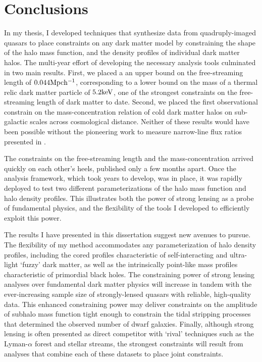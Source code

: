 \chapter{Conclusions}

In my thesis, I developed techniques that synthesize data from quadruply-imaged quasars to place constraints on any dark matter model by constraining the shape of the halo mass function, and the density profiles of individual dark matter halos. The multi-year effort of developing the necessary analysis tools culminated in two main results. First, we placed a an upper bound on the free-streaming length of $0.044 \rm{Mpc}{h^{-1}}$, corresponding to a lower bound on the mass of a thermal relic dark matter particle of $5.2 \rm{keV}$, one of the strongest constraints on the free-streaming length of dark matter to date. Second, we placed the first observational constrain on the mass-concentration relation of cold dark matter halos on sub-galactic scales across cosmological distance. Neither of these results would have been possible without the pioneering work to measure narrow-line flux ratios presented in \cite{Nierenberg++19}. 

The constraints on the free-streaming length and the mass-concentration arrived quickly on each other's heels, published only a few months apart. Once the analysis framework, which took years to develop, was in place, it was rapidly deployed to test two different parameterizations of the halo mass function and halo density profiles. This illustrates both the power of strong lensing as a probe of fundamental physics, and the flexibility of the tools I developed to efficiently exploit this power. 

The results I have presented in this dissertation suggest new avenues to pursue. The flexibility of my method accommodates any parameterization of halo density profiles, including the cored profiles characteristic of self-interacting and ultra-light `fuzzy' dark matter, as well as the intrinsically point-like mass profiles characteristic of primordial black holes. The constraining power of strong lensing analyses over fundamental dark matter physics will increase in tandem with the ever-increasing sample size of strongly-lensed quasars with reliable, high-quality data. This enhanced constraining power may deliver constraints on the amplitude of subhalo mass function tight enough to constrain the tidal stripping processes that determined the observed number of dwarf galaxies. Finally, although strong lensing is often presented as direct competitor with `rival' techniques such as the Lyman-$\alpha$ forest and stellar streams, the strongest constraints will result from analyses that combine each of these datasets to place joint constraints. 
